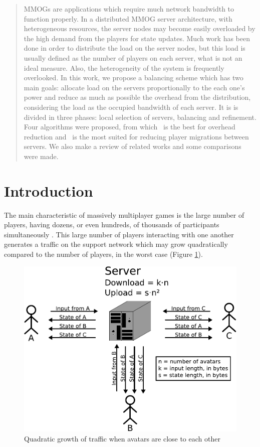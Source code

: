 \begin{abstract}
MMOGs are applications which require much network bandwidth to function properly. In a distributed MMOG server architecture, with heterogeneous resources, the server nodes may become easily overloaded by the high demand from the players for state updates. Much work has been done in order to distribute the load on the server nodes, but this load is usually defined as the number of players on each server, what is not an ideal measure. Also, the heterogeneity of the system is frequently overlooked. In this work, we propose a balancing scheme which has two main goals: allocate load on the servers proportionally to the each one's power and reduce as much as possible the overhead from the distribution, considering the load as the occupied bandwidth of each server. It is is divided in three phases: local selection of servers, balancing and refinement. Four algorithms were proposed, from which \ggp\ is the best for overhead reduction and \ggpf\ is the most suited for reducing player migrations between servers. We also make a review of related works and some comparisons were made.

\end{abstract}

\section{Introduction}
\label{sec:intro}



The main characteristic of massively multiplayer games is the large number of players, having dozens, or even hundreds, of thousands of participants simultaneously \cite{schiele2007rpp}. This large number of players interacting with one another generates a traffic on the support network which may grow quadratically compared to the number of players, in the worst case (Figure \ref{fig:quadratic}).

\begin{figure}
  \centering
  \includegraphics[width=0.6\linewidth]{images/quadratic}
  \caption{Quadratic growth of traffic when avatars are close to each other}
  \label{fig:quadratic}
\end{figure}

